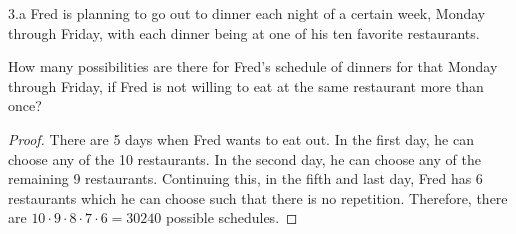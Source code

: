 \begin{exercise}{3.a}
Fred is planning to go out to dinner each night of a certain week, Monday through Friday, with each dinner being at one of his ten favorite restaurants.

\vspace{1em}
How many possibilities are there for Fred’s schedule of dinners for that Monday through Friday, if Fred is not willing to eat at the same restaurant more than once?
\end{exercise}

\begin{proof}
    There are 5 days when Fred wants to eat out. In the first day, he can choose any of the 10 restaurants. In the second day, he can choose any of the remaining 9 restaurants. Continuing this, in the fifth and last day, Fred has 6 restaurants which he can choose such that there is no repetition. Therefore, there are $10 \cdot 9 \cdot 8 \cdot 7 \cdot 6 = 30240$ possible schedules.
\end{proof}


